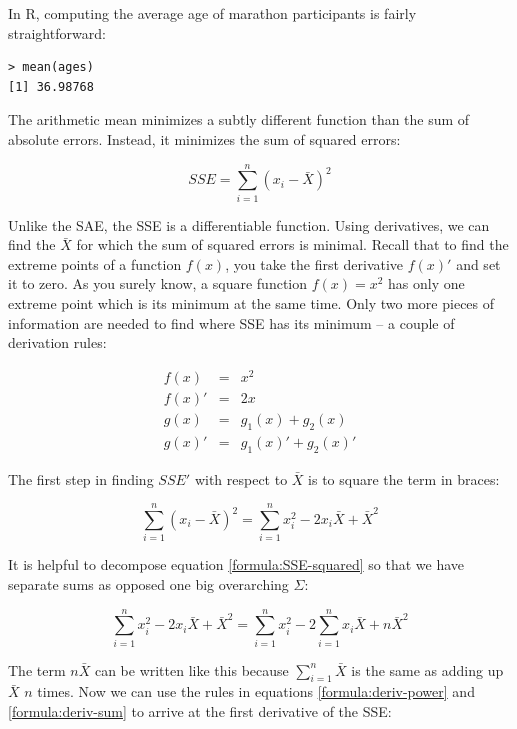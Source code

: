 \documentclass{tufte-book} %
\begin{document}
In R, computing the average age of marathon participants is fairly straightforward:

\begin{Verbatim}
> mean(ages)
[1] 36.98768
\end{Verbatim}

The arithmetic mean minimizes a subtly different function than the sum of absolute errors. Instead, it minimizes the sum of squared errors:

\begin{equation} \label{formula:sse}
	SSE = \sum_{i=1}^n (x_i - \bar{X})^2
\end{equation}

Unlike the SAE, the SSE is a differentiable function. Using derivatives, we can find the $\bar{X}$ for which the sum of squared errors is minimal. Recall that to find the extreme points of a function $f(x)$, you take the first derivative $f(x)'$ and set it to zero. As you surely know, a square function $f(x) = x^2$ has only one extreme point which is its minimum at the same time. Only two more pieces of information are needed to find where SSE has its minimum -- a couple of derivation rules:

\begin{eqnarray}
f(x) &=& x^2 \label{formula:deriv-power}\\ 
f(x)' &=& 2x \nonumber \\
g(x) &=& g_1(x) + g_2(x)  \label{formula:deriv-sum}\\
g(x)' &=& g_1(x)' + g_2(x)' \nonumber
\end{eqnarray}

The first step in finding $SSE'$ with respect to $\bar{X}$ is to square the term in braces:

\begin{equation}
\sum_{i=1}^n (x_i - \bar{X})^2 = \sum_{i=1}^n x_i^2 - 2x_i\bar{X} + \bar{X}^2
\label{formula:SSE-squared}
\end{equation}

It is helpful to decompose equation \ref{formula:SSE-squared} so that we have separate sums as opposed one big overarching $\Sigma$:

\begin{equation}
\sum_{i=1}^n x_i^2 - 2x_i\bar{X} + \bar{X}^2 = \sum_{i=1}^n x_i^2 - 2\sum_{i=1}^nx_i\bar{X} + n\bar{X}^2
\end{equation}

The term $n\bar{X}$ can be written like this because $\sum_{i=1}^n\bar{X}$ is the same as adding up $\bar{X}$ $n$ times. Now we can use the rules in equations \ref{formula:deriv-power} and \ref{formula:deriv-sum} to arrive at the first derivative of the SSE:
\end{document}
